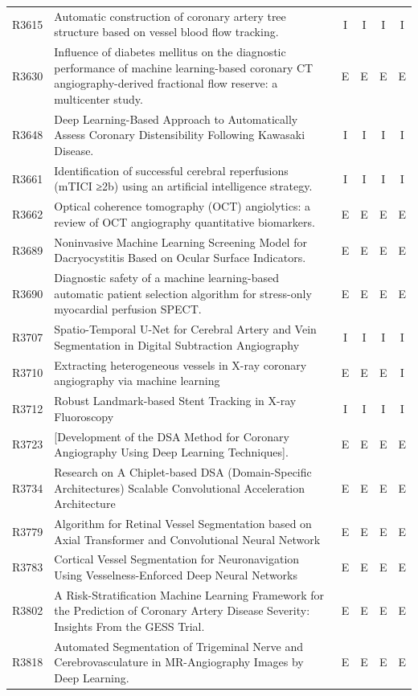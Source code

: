 \begin{longtable}{@{}l p{8.6cm} c c c c@{}}
R3615 & Automatic construction of coronary artery tree structure based on vessel blood flow tracking. & I & I & I & I \\
R3630 & Influence of diabetes mellitus on the diagnostic performance of machine learning-based coronary CT angiography-derived fractional flow reserve: a multicenter study. & E & E & E & E \\
R3648 & Deep Learning-Based Approach to Automatically Assess Coronary Distensibility Following Kawasaki Disease. & I & I & I & I \\
R3661 & Identification of successful cerebral reperfusions (mTICI ≥2b) using an artificial intelligence strategy. & I & I & I & I \\
R3662 & Optical coherence tomography (OCT) angiolytics: a review of OCT angiography quantitative biomarkers. & E & E & E & E \\
R3689 & Noninvasive Machine Learning Screening Model for Dacryocystitis Based on Ocular Surface Indicators. & E & E & E & E \\
R3690 & Diagnostic safety of a machine learning-based automatic patient selection algorithm for stress-only myocardial perfusion SPECT. & E & E & E & E \\
R3707 & Spatio-Temporal U-Net for Cerebral Artery and Vein Segmentation in Digital Subtraction Angiography & I & I & I & I \\
R3710 & Extracting heterogeneous vessels in X-ray coronary angiography via machine learning & E & E & E & I \\
R3712 & Robust Landmark-based Stent Tracking in X-ray Fluoroscopy & I & I & I & I \\
R3723 & [Development of the DSA Method for Coronary Angiography Using Deep Learning Techniques]. & E & E & E & E \\
R3734 & Research on A Chiplet-based DSA (Domain-Specific Architectures) Scalable Convolutional Acceleration Architecture & E & E & E & E \\
R3779 & Algorithm for Retinal Vessel Segmentation based on Axial Transformer and Convolutional Neural Network & E & E & E & E \\
R3783 & Cortical Vessel Segmentation for Neuronavigation Using Vesselness-Enforced Deep Neural Networks & E & E & E & E \\
R3802 & A Risk-Stratification Machine Learning Framework for the Prediction of Coronary Artery Disease Severity: Insights From the GESS Trial. & E & E & E & E \\
R3818 & Automated Segmentation of Trigeminal Nerve and Cerebrovasculature in MR-Angiography Images by Deep Learning. & E & E & E & E \\

\end{longtable}
